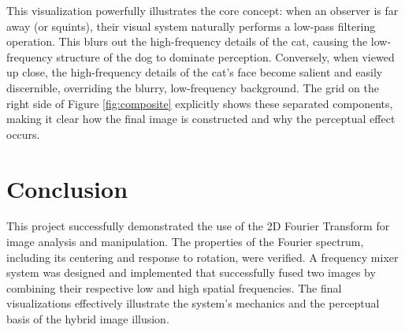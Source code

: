 \documentclass[11pt, a4paper]{article}
\begin{document}
This visualization powerfully illustrates the core concept: when an observer is far away (or squints), their visual system naturally performs a low-pass filtering operation. This blurs out the high-frequency details of the cat, causing the low-frequency structure of the dog to dominate perception. Conversely, when viewed up close, the high-frequency details of the cat's face become salient and easily discernible, overriding the blurry, low-frequency background. The grid on the right side of Figure \ref{fig:composite} explicitly shows these separated components, making it clear how the final image is constructed and why the perceptual effect occurs.

\section{Conclusion}
This project successfully demonstrated the use of the 2D Fourier Transform for image analysis and manipulation. The properties of the Fourier spectrum, including its centering and response to rotation, were verified. A frequency mixer system was designed and implemented that successfully fused two images by combining their respective low and high spatial frequencies. The final visualizations effectively illustrate the system's mechanics and the perceptual basis of the hybrid image illusion.

\appendix
\end{document}
